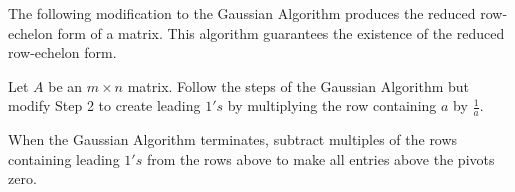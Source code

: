 \documentclass{ximera}
\begin{document}
The following modification to the Gaussian Algorithm produces the reduced row-echelon form of a matrix.  This algorithm guarantees the existence of the reduced row-echelon form.

\begin{algorithm} \label{alg:gauss-jordan} 
Let $A$ be an $m\times n$ matrix.
Follow the steps of the Gaussian Algorithm but modify Step 2 to create leading $1's$ by multiplying the row containing $a$ by $\frac{1}{a}$.





When the Gaussian Algorithm terminates, subtract multiples of the rows containing leading $1's$ from the rows above to make all entries above the pivots zero.
\end{algorithm}
\end{document}
